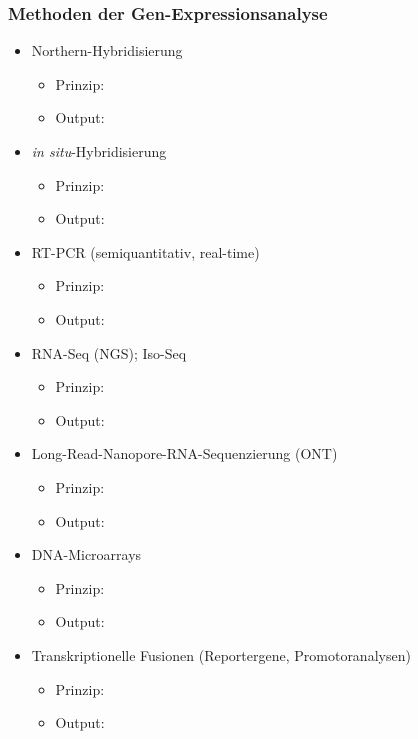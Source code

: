 \subsubsection{Methoden der Gen-Expressionsanalyse}
\begin{itemize}
    \item Northern-Hybridisierung
    \begin{itemize}
        \item Prinzip:
        \item Output:
    \end{itemize}
    \item \textit{in situ}-Hybridisierung
    \begin{itemize}
        \item Prinzip:
        \item Output:
    \end{itemize}
    \item RT-PCR (semiquantitativ, real-time)
    \begin{itemize}
        \item Prinzip:
        \item Output:
    \end{itemize}
    \item RNA-Seq (NGS); Iso-Seq
    \begin{itemize}
        \item Prinzip:
        \item Output:
    \end{itemize}
    \item Long-Read-Nanopore-RNA-Sequenzierung (ONT)
    \begin{itemize}
        \item Prinzip:
        \item Output:
    \end{itemize}
    \item DNA-Microarrays
    \begin{itemize}
        \item Prinzip:
        \item Output:
    \end{itemize}
    \item Transkriptionelle Fusionen (Reportergene, Promotoranalysen)
    \begin{itemize}
        \item Prinzip:
        \item Output:
    \end{itemize}
\end{itemize}




